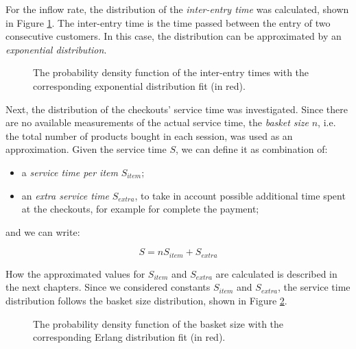 For the inflow rate, the distribution of the \emph{inter-entry time} was calculated, shown in Figure \ref{fig:inter_arrival_time_distribution}. The inter-entry time is the time passed between the entry of two consecutive customers. In this case, the distribution can be approximated by an \emph{exponential distribution}.

\begin{figure}
  \begin{center}
  \end{center}
  \caption{The probability density function of the inter-entry times with the corresponding exponential distribution fit (in red).}
  \label{fig:inter_arrival_time_distribution}
\end{figure}

Next, the distribution of the checkouts’ service time was investigated. Since there are no available measurements of the actual service time, the \emph{basket size} \( n \), i.e. the total number of products bought in each session, was used as an approximation. Given the service time \( S \), we can define it as combination of:
\begin{itemize}
  \item a \emph{service time per item} \( S_{item} \);
  \item an \emph{extra service time} \( S_{extra} \), to take in account possible additional time spent at the checkouts, for example for complete the payment;
\end{itemize}
and we can write:

\begin{equation}
  S = n S_{item} + S_{extra}
\end{equation}

How the approximated values for \( S_{item} \) and \( S_{extra} \) are calculated is described in the next chapters. Since we considered constants \( S_{item} \) and \( S_{extra} \), the service time distribution follows the basket size distribution, shown in Figure \ref{fig:basket_size_distribution}.

\begin{figure}
  \begin{center}
  \end{center}
  \caption{The probability density function of the basket size with the corresponding Erlang distribution fit (in red).}
  \label{fig:basket_size_distribution}
\end{figure}

